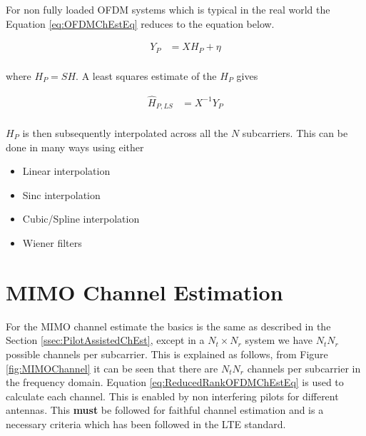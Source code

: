 For non fully loaded OFDM systems which is typical in the real world the Equation \ref{eq:OFDMChEstEq} reduces to the equation below.

\begin{equation}\label{eq:ReducedRankOFDMChEstEq}
    \begin{aligned}
        Y_P & = XH_P + \eta \\
    \end{aligned}
\end{equation}

{where } $H_P = SH$. A least squares estimate of the $H_P$ gives 

\begin{equation}\label{eq:ReducedRankOFDMChEstEq}
    \begin{aligned}
        \hat{H}_{P,LS} & = X^{-1}Y_P \\
    \end{aligned}
\end{equation}

$H_P$ is then subsequently interpolated across all the $N$ subcarriers. This can be done in many ways using either
\begin{itemize}
    \item Linear interpolation
    \item Sinc interpolation
    \item Cubic/Spline interpolation
    \item Wiener filters
\end{itemize}

\section{MIMO Channel Estimation}\label{sec:MIMO}

For the MIMO channel estimate the basics is the same as described in the Section \ref{ssec:PilotAssistedChEst}, except in a $N_t{\times}N_r$ system we have $N_tN_r$ possible channels per subcarrier. This is explained as follows, from Figure \ref{fig:MIMOChannel} it can be seen that there are $N_tN_r$ channels per subcarrier in the frequency domain. Equation \ref{eq:ReducedRankOFDMChEstEq} is used to calculate each channel. This is enabled by non interfering pilots for different antennas. This \textbf{must} be followed for faithful channel estimation and is a necessary criteria which has been followed in the LTE standard.

